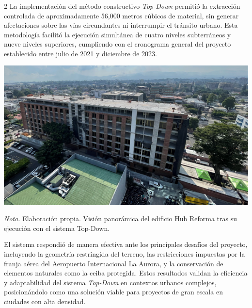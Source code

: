 \documentclass[12pt,spanish,Letterpaper,openany]{book}
\begin{document}
\begin {multicols}{2}
La implementación del método constructivo \emph{Top-Down} permitió la extracción controlada de aproximadamente 56,000 metros cúbicos de material, sin generar afectaciones sobre las vías circundantes ni interrumpir el tránsito urbano. Esta metodología facilitó la ejecución simultánea de cuatro niveles subterráneos y nueve niveles superiores, cumpliendo con el cronograma general del proyecto establecido entre julio de 2021 y diciembre de 2023.

\begin {flushleft}
\noindent\begin{minipage}[c]{\columnwidth}

\textbf{}

\begin{center}\includegraphics[width=1\linewidth]{imagenes_articulos/art02_04} \end{center}

\emph{Nota.} Elaboración propia. Visión panorámica del edificio Hub Reforma tras su ejecución con el sistema Top-Down.

\end{minipage}
\end {flushleft}

El sistema respondió de manera efectiva ante los principales desafíos del proyecto, incluyendo la geometría restringida del terreno, las restricciones impuestas por la franja aérea del Aeropuerto Internacional La Aurora, y la conservación de elementos naturales como la ceiba protegida. Estos resultados validan la eficiencia y adaptabilidad del sistema \emph{Top-Down} en contextos urbanos complejos, posicionándolo como una solución viable para proyectos de gran escala en ciudades con alta densidad.

\bigskip
\bigskip
\bigskip


\end{multicols}
\end{document}
